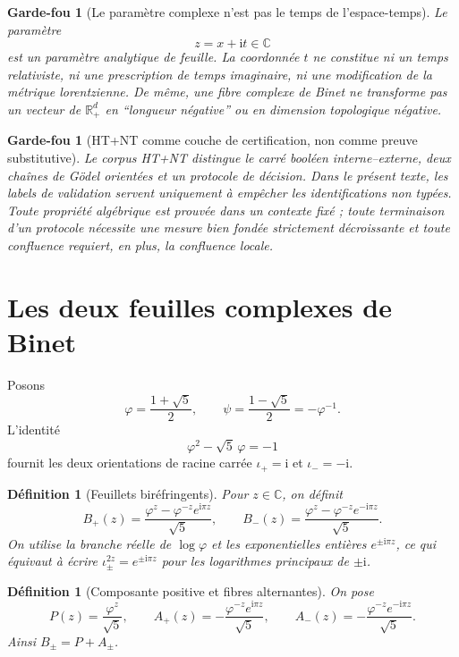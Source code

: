 \documentclass[11pt,a4paper]{article}
\newtheorem{definition}[theorem]{Définition}
\newtheorem{guardrail}[theorem]{Garde-fou}
\newcommand{\C}{\mathbb C}
\newcommand{\Rp}{\mathbb R_{+}}
\newcommand{\ii}{\mathrm i}
\newcommand{\ph}{\varphi}
\begin{document}
\begin{guardrail}[Le paramètre complexe n'est pas le temps de l'espace-temps]
Le paramètre
\[
 z=x+\ii t\in\C
\]
est un paramètre analytique de feuille. La coordonnée $t$ ne constitue ni un temps relativiste, ni une prescription de temps imaginaire, ni une modification de la métrique lorentzienne. De même, une fibre complexe de Binet ne transforme pas un vecteur de $\Rp^d$ en ``longueur négative'' ou en dimension topologique négative.
\end{guardrail}

\begin{guardrail}[HT+NT comme couche de certification, non comme preuve substitutive]
Le corpus HT+NT distingue le carré booléen interne--externe, deux chaînes de Gödel orientées et un protocole de décision. Dans le présent texte, les labels de validation servent uniquement à empêcher les identifications non typées. Toute propriété algébrique est prouvée dans un contexte fixé ; toute terminaison d'un protocole nécessite une mesure bien fondée strictement décroissante et toute confluence requiert, en plus, la confluence locale.
\end{guardrail}

\section{Les deux feuilles complexes de Binet}

Posons
\[
 \ph=\frac{1+\sqrt5}{2},\qquad \psi=\frac{1-\sqrt5}{2}=-\ph^{-1}.
\]
L'identité
\[
 \ph^2-\sqrt5\,\ph=-1
\]
fournit les deux orientations de racine carrée $\iota_+=\ii$ et $\iota_-=-\ii$.

\begin{definition}[Feuillets biréfringents]
Pour $z\in\C$, on définit
\begin{equation}\label{eq:Bpm}
 B_+(z)=\frac{\ph^z-\ph^{-z}e^{\ii\pi z}}{\sqrt5},
 \qquad
 B_-(z)=\frac{\ph^z-\ph^{-z}e^{-\ii\pi z}}{\sqrt5}.
\end{equation}
On utilise la branche réelle de $\log\ph$ et les exponentielles entières $e^{\pm\ii\pi z}$, ce qui équivaut à écrire $\iota_\pm^{2z}=e^{\pm\ii\pi z}$ pour les logarithmes principaux de $\pm\ii$.
\end{definition}

\begin{definition}[Composante positive et fibres alternantes]
On pose
\[
 P(z)=\frac{\ph^z}{\sqrt5},\qquad
 A_+(z)=-\frac{\ph^{-z}e^{\ii\pi z}}{\sqrt5},\qquad
 A_-(z)=-\frac{\ph^{-z}e^{-\ii\pi z}}{\sqrt5}.
\]
Ainsi $B_\pm=P+A_\pm$.
\end{definition}
\end{document}

